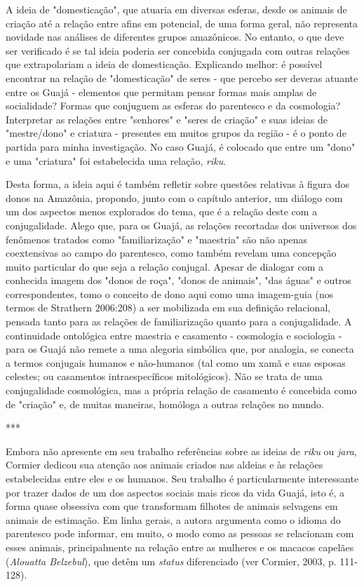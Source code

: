 A ideia de "domesticação", que atuaria em diversas esferas, desde os
animais de criação até a relação entre afins em potencial, de uma forma
geral, não representa novidade nas análises de diferentes grupos
amazônicos. No entanto, o que deve ser verificado é se tal ideia poderia
ser concebida conjugada com outras relações que extrapolariam a ideia de
domesticação. Explicando melhor: é possível encontrar na relação de
"domesticação" de seres - que percebo ser deveras atuante entre os Guajá
- elementos que permitam pensar formas mais amplas de socialidade?
Formas que conjuguem as esferas do parentesco e da cosmologia?
Interpretar as relações entre "senhores" e "seres de criação" e suas
ideias de "mestre/dono" e criatura - presentes em muitos grupos da
região - é o ponto de partida para minha investigação. No caso Guajá, é
colocado que entre um "dono" e uma "criatura" foi estabelecida uma
relação, \emph{riku}.

Desta forma, a ideia aqui é também refletir sobre questões relativas à
figura dos donos na Amazônia, propondo, junto com o capítulo anterior,
um diálogo com um dos aspectos menos explorados do tema, que é a relação
deste com a conjugalidade. Alego que, para os Guajá, as relações
recortadas dos universos dos fenômenos tratados como "familiarização" e
"maestria" são não apenas coextensivas ao campo do parentesco, como
também revelam uma concepção muito particular do que seja a relação
conjugal. Apesar de dialogar com a conhecida imagem dos "donos de roça",
"donos de animais", "das águas" e outros correspondentes, tomo o
conceito de dono aqui como uma imagem-guia (nos termos de Strathern
2006:208) a ser mobilizada em sua definição relacional, pensada tanto
para as relações de familiarização quanto para a conjugalidade. A
continuidade ontológica entre maestria e casamento - cosmologia e
sociologia - para os Guajá não remete a uma alegoria simbólica que, por
analogia, se conecta a termos conjugais humanos e não-humanos (tal como
um xamã e suas esposas celestes; ou casamentos intraespecíficos
mitológicos). Não se trata de uma conjugalidade cosmológica, mas a
própria relação de casamento é concebida como de "criação" e, de muitas
maneiras, homóloga a outras relações no mundo.

***

Embora não apresente em seu trabalho referências sobre as ideias de
\emph{riku} ou \emph{jara}, Cormier dedicou sua atenção aos animais
criados nas aldeias e às relações estabelecidas entre eles e os humanos.
Seu trabalho é particularmente interessante por trazer dados de um dos
aspectos sociais mais ricos da vida Guajá, isto é, a forma quase
obsessiva com que transformam filhotes de animais selvagens em animais
de estimação. Em linha gerais, a autora argumenta como o idioma do
parentesco pode informar, em muito, o modo como as pessoas se relacionam
com esses animais, principalmente na relação entre as mulheres e os
macacos capelães (\emph{Alouatta Belzebul}), que detêm um \emph{status}
diferenciado (ver Cormier, 2003, p. 111-128).

